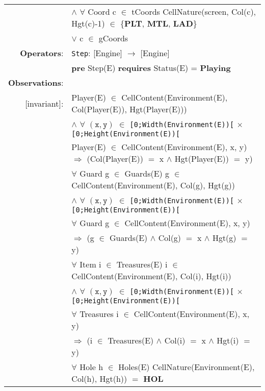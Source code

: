 \documentclass[8pt]{article}
\begin{document}
{\begin{longtable}{rl}
  & \quad\quad\quad $\land$ $\forall$ \textrm{Coord} c $\in$ tCoords \textrm{CellNature(screen, Col(c), Hgt(c)-1)} $\in$ \{\textbf{PLT}, \textbf{MTL}, \textbf{LAD}\} \\
  & \quad\quad\quad\quad\quad $\lor$ c $\in$ gCoords \\
  \textbf{Operators}: &\texttt{Step}: \textrm{[Engine]} $\rightarrow$ \textrm{[Engine]} \\
  & \quad \textbf{pre} \textrm{Step(E)} \textbf{requires} \textrm{Status(E)} = \textbf{Playing}\\
  \textbf{Observations}:&\\
  \textrm{[invariant]}:& \textrm{Player(E)} $\in$ \textrm{CellContent(Environment(E), Col(Player(E)), Hgt(Player(E)))}\\
  & \quad\quad $\land$ $\forall$ $(\mathtt{x},\mathtt{y})$ $\in$ \texttt{[0;Width(Environment(E))[} $\times$ \texttt{[0;Height(Environment(E))[}\\
  & \quad\quad\quad\quad \textrm{Player(E)} $\in$ \textrm{CellContent(Environment(E), x, y)} $\Rightarrow$ (\textrm{Col(Player(E))} $=$ x $\land$ \textrm{Hgt(Player(E))} $=$ y)\\
  & $\forall$ \textrm{Guard} g $\in$ \textrm{Guards(E)} g $\in$ \textrm{CellContent(Environment(E), Col(g), Hgt(g))}\\
  & \quad\quad $\land$ $\forall$ $(\mathtt{x},\mathtt{y})$ $\in$ \texttt{[0;Width(Environment(E))[} $\times$ \texttt{[0;Height(Environment(E))[}\\
  & \quad\quad\quad\quad $\forall$ \textrm{Guard} g $\in$ \textrm{CellContent(Environment(E), x, y)} \\
  & \quad\quad\quad\quad\quad\quad $\Rightarrow$ (g $\in$ \textrm{Guards(E)} $\land$ \textrm{Col(g)} $=$ x $\land$ \textrm{Hgt(g)} $=$ y)\\
  & $\forall$ \textrm{Item} i $\in$ \textrm{Treasures(E)} i $\in$ \textrm{CellContent(Environment(E), Col(i), Hgt(i))}\\
  & \quad\quad $\land$ $\forall$ $(\mathtt{x},\mathtt{y})$ $\in$ \texttt{[0;Width(Environment(E))[} $\times$ \texttt{[0;Height(Environment(E))[}\\
  & \quad\quad\quad\quad $\forall$ \textrm{Treasures} i $\in$ \textrm{CellContent(Environment(E), x, y)} \\
  & \quad\quad\quad\quad\quad\quad $\Rightarrow$ (i $\in$ \textrm{Treasures(E)} $\land$ \textrm{Col(i)} $=$ x $\land$ \textrm{Hgt(i)} $=$ y)\\
  & $\forall$ \textrm{Hole} h $\in$ \textrm{Holes(E)} CellNature(Environment(E), Col(h), Hgt(h)) $=$ \textbf{HOL}\\

\end{longtable}}
\end{document}
